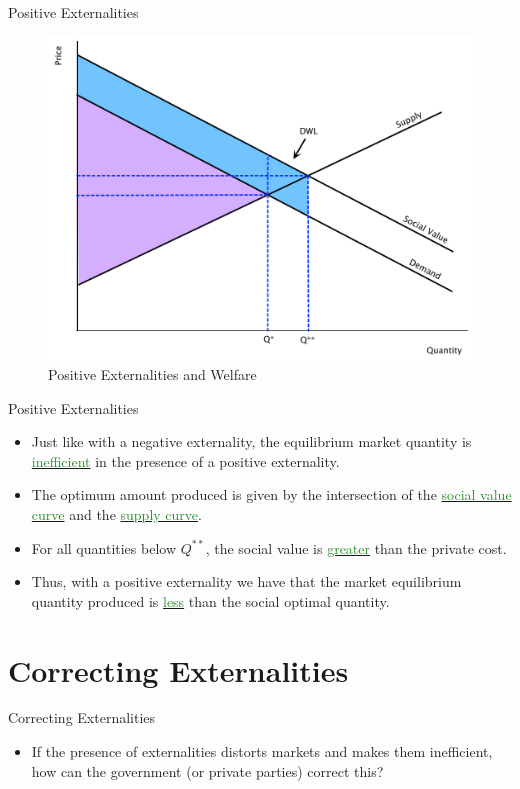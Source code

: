 \documentclass[xcolor={dvipsnames},pdf, hyperref={colorlinks=true, citecolor=ForestGreen, linkcolor=BlueViolet, urlcolor=Magenta}]{beamer}
\newcommand{\dd}[1]{{\underline{\textcolor{ForestGreen}{#1}}}}
\begin{document}
\begin{frame}[b]{Positive Externalities}
		\begin{figure}[H]
			\centering
			\includegraphics[scale=.35]{plot53.pdf}
			\caption{Positive Externalities and Welfare}
		\end{figure}
\end{frame}


\begin{frame}{Positive Externalities}
	\begin{itemize}
		\item 	Just like with a negative externality, the equilibrium market quantity is \dd{inefficient} in the presence of a positive externality.
		\item The optimum amount produced is given by the intersection of the \dd{social value curve} and the \dd{supply curve}. 
		\item For all quantities below $Q^{**}$, the social value is \dd{greater} than the private cost.
		\item Thus, with a positive externality we have that the market equilibrium quantity produced is \dd{less} than the social optimal quantity. 
	\end{itemize}
\end{frame}

\section{Correcting Externalities}

\begin{frame}{Correcting Externalities}
	\begin{itemize}
		\item If the presence of externalities distorts markets and makes them inefficient, how can the government (or private parties) correct this?
	
	\end{itemize}
\end{frame}
\end{document}
